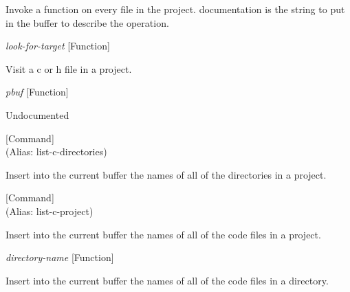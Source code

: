 \begin{doc-string}
Invoke a function on every file in the project.
documentation is the string to put in the buffer to describe the operation.
\end{doc-string}

\vspace{1em}
\noindent
{}
\usebox{\funcname}\emph{look-for-target}
 \hfill [Function]

\begin{doc-string}
Visit a c or h file in a project.
\end{doc-string}

\vspace{1em}
\noindent
{}
\usebox{\funcname}\emph{pbuf}
 \hfill [Function]

\begin{doc-string}
Undocumented
\end{doc-string}

\vspace{1em}
\noindent
{}
\usebox{\funcname}
 \hfill [Command]\\%
 (Alias: list-c-directories)

\begin{doc-string}
Insert into the current buffer the names of all of the directories in a project.
\end{doc-string}

\vspace{1em}
\noindent
{}
\usebox{\funcname}
 \hfill [Command]\\%
 (Alias: list-c-project)

\begin{doc-string}
Insert into the current buffer the names of all of the code files in a project.
\end{doc-string}

\vspace{1em}
\noindent
{}
\usebox{\funcname}\emph{directory-name}
 \hfill [Function]

\begin{doc-string}
Insert into the current buffer the names of all of the code files in a directory.
\end{doc-string}

